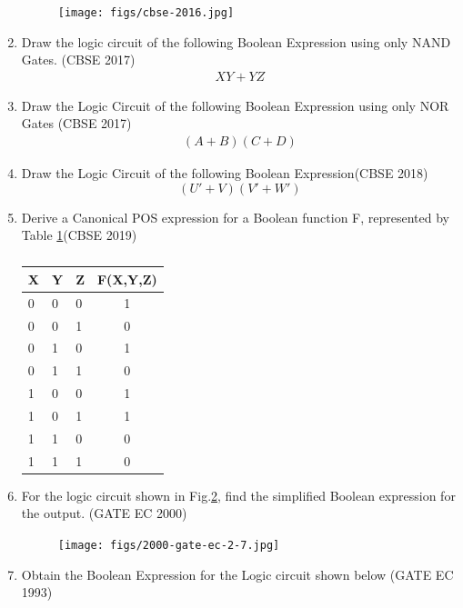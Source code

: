\begin{enumerate}
\begin{figure}
\centering
\texttt{[image: figs/cbse-2016.jpg]}
\caption{}
\label{fig:2016/c/6/b}
\end{figure}
\item Draw the logic circuit of the following Boolean Expression using only NAND Gates.
\hfill (CBSE 2017)
\label{prob:2017-1/c/6/b}
		\begin{align}
\label{eq:2017-1/c/6/b}
 XY + YZ
		\end{align}
\item Draw the Logic Circuit of the following Boolean Expression using only NOR Gates  
\hfill (CBSE 2017)
\label{prob:2017/c/6/b}
      \begin{align}
      (A+B)(C+D)
      \end{align}
\item Draw the Logic Circuit of the following Boolean Expression\hfill (CBSE 2018)
\begin{equation} 
(U'+V)(V'+W')
\end{equation}
\label{prob:2018/c/6/b}
\item Derive a Canonical POS expression for a Boolean function F, represented by 
Table \ref{tab:2019/c/6/c}\hfill (CBSE 2019)
\label{prob:2019/c/6/c}
\begin{table}[!ht]
\centering
\begin{tabular}{|l|l|l|c|}
	\hline
	X&Y&Z&F(X,Y,Z)\\
	\hline
	0&0&0&1\\
	0&0&1&0\\
	0&1&0&1\\
	0&1&1&0\\
	1&0&0&1\\
	1&0&1&1\\
	1&1&0&0\\
	1&1&1&0\\
	\hline
\end{tabular}
\caption{}
\label{tab:2019/c/6/c}
\end{table}
\item For the logic circuit shown in Fig.\ref{fig:2000/gate/ec/2/7}, find the simplified Boolean expression for the output. 
\label{prob:2000/gate/ec/2/7}
\hfill (GATE EC 2000)
\begin{figure}[!ht]
    \centering
    \texttt{[image: figs/2000-gate-ec-2-7.jpg]}
    \caption{}
\label{fig:2000/gate/ec/2/7}
\end{figure}
\item 
Obtain the Boolean Expression for the Logic circuit shown below
\label{prob:1993/gate/ec/4/8}
\hfill (GATE EC 1993)
	  	

\end{enumerate}
